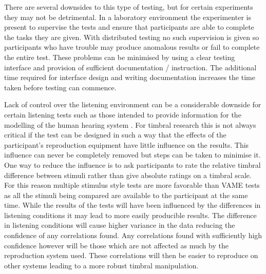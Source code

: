 			There are several downsides to this type of testing, but for certain experiments they may not be
			detrimental. In a laboratory environment the experimenter is present to supervise the tests and
			ensure that participants are able to complete the tasks they are given.  With distributed testing
			no such supervision is given so participants who have trouble may produce anomalous results or
			fail to complete the entire test. These problems can be minimised by using a clear testing
			interface and provision of sufficient documentation / instruction. The additional time required for
			interface design and writing documentation increases the time taken before testing can commence.

			Lack of control over the listening environment can be a considerable downside for certain listening
			tests such as those intended to provide information for the modelling of the human hearing system
			\citep{moore1990auditory}. For timbral research this is not always critical if the test can be
			designed in such a way that the effects of the participant's reproduction equipment have little
			influence on the results. This influence can never be completely removed but steps can be taken to
			minimise it.  One way to reduce the influence is to ask participants to rate the relative timbral
			difference between stimuli rather than give absolute ratings on a timbral scale. For this reason
			multiple stimulus style tests are more favorable than VAME tests as all the stimuli being compared
			are available to the participant at the same time. While the results of the tests will have been
			influenced by the differences in listening conditions it may lead to more easily producible
			results. The difference in listening conditions will cause higher variance in the data reducing the
			confidence of any correlations found. Any correlations found with sufficiently high confidence
			however will be those which are not affected as much by the reproduction system used.  These
			correlations will then be easier to reproduce on other systems leading to a more robust timbral
			manipulation.

